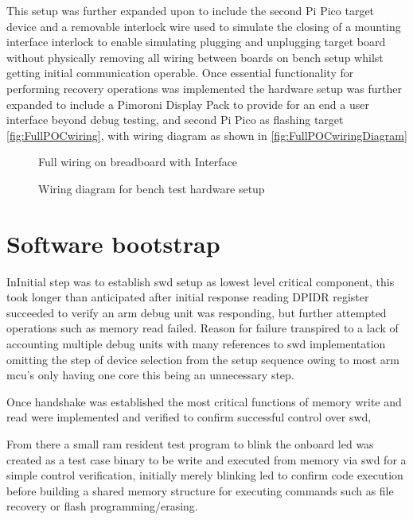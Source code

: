 This setup was further expanded upon to include the second Pi Pico target device and a removable interlock wire used to simulate the closing of a mounting interface interlock to enable simulating plugging and unplugging target board without physically removing all wiring between boards on bench setup whilst getting initial communication operable. Once essential functionality for performing recovery operations was implemented the hardware setup was further expanded to include a Pimoroni Display Pack to provide for an end a user interface beyond debug testing, and second Pi Pico as flashing target \autoref{fig:FullPOCwiring}, with wiring diagram as shown in \autoref{fig:FullPOCwiringDiagram}

\begin{figure}[ht]
	\centering
	\caption{Full wiring on breadboard with Interface}
	\label{fig:FullPOCwiring}
\end{figure}

\begin{figure}[ht]
	\centering
	\caption{Wiring diagram for bench test hardware setup}
	\label{fig:FullPOCwiringDiagram}
\end{figure}
\clearpage
\section{Software bootstrap}
InInitial step was to establish \gls{swd} setup as lowest level critical component, this took longer than anticipated after initial response reading DPIDR register succeeded to verify an \gls{arm} debug unit was responding, but further attempted operations such as memory read failed. Reason for failure transpired to a lack of accounting multiple debug units\cite{raspberrypiltdRaspberryPiPico} with many references to \gls{swd} implementation omitting the step of device selection from the setup sequence owing to most \gls{arm} \gls{mcu}'s only having one core this being an unnecessary step.

Once handshake was established the most critical functions of memory write and read were implemented and verified to confirm successful control over \gls{swd}, 

From there a small \gls{ram} resident test program to blink the onboard \gls{led} was created as a test case binary to be write and executed from memory via \gls{swd} for a simple control verification, initially merely blinking \gls{led} to confirm code execution before building a shared memory structure for executing commands such as file recovery or flash programming/erasing.

